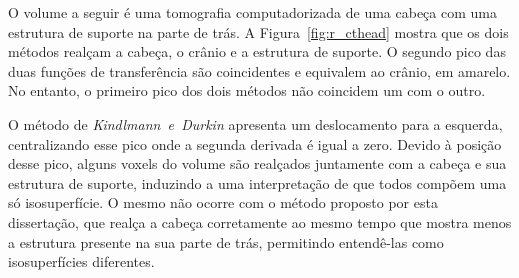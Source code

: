 %
\newpage
	O volume a seguir é uma tomografia computadorizada de uma cabeça com uma estrutura de suporte na parte de trás. A Figura~\ref{fig:r_cthead} mostra que os dois métodos realçam a cabeça, o crânio e a estrutura de suporte. O segundo pico das duas funções de transferência são coincidentes e equivalem ao crânio, em amarelo. No entanto, o primeiro pico dos dois métodos não coincidem um com o outro.
	
	O método de \textit{Kindlmann~e~Durkin} apresenta um deslocamento para a esquerda, centralizando esse pico onde a segunda derivada é igual a zero. Devido à posição desse pico, alguns voxels do volume são realçados juntamente com a cabeça e sua estrutura de suporte, induzindo a uma interpretação de que todos compõem uma só isosuperfície. O mesmo não ocorre com o método proposto por esta dissertação, que realça a cabeça corretamente ao mesmo tempo que mostra menos a estrutura presente na sua parte de trás, permitindo entendê-las como isosuperfícies diferentes.

